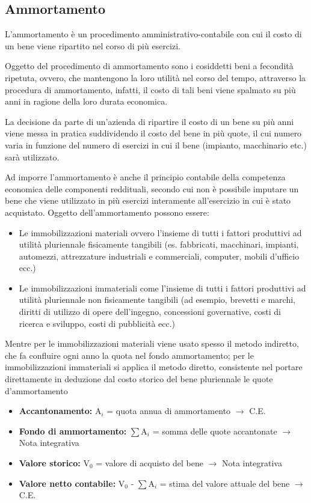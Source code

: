\subsection{Ammortamento}
L'ammortamento è un procedimento amministrativo-contabile con cui il costo di un bene viene ripartito nel corso di più esercizi.

Oggetto del procedimento di ammortamento sono i cosiddetti beni a fecondità ripetuta, ovvero, che mantengono la loro utilità nel corso del tempo, attraverso la procedura di ammortamento, infatti, il costo di tali beni viene spalmato su più anni in ragione della loro durata economica.

La decisione da parte di un’azienda di ripartire il costo di un bene su più anni viene messa in pratica suddividendo il costo del bene in più quote, il cui numero varia in funzione del numero di esercizi in cui il bene (impianto, macchinario etc.) sarà utilizzato.

Ad imporre l’ammortamento è anche il principio contabile della competenza economica delle componenti reddituali, secondo cui non è possibile imputare un bene che viene utilizzato in più esercizi interamente all'esercizio in cui è stato acquistato.
Oggetto dell'ammortamento possono essere:
\begin{itemize}
	\item Le immobilizzazioni materiali ovvero l’insieme di tutti i fattori produttivi ad utilità pluriennale fisicamente tangibili (es. fabbricati, macchinari, impianti, automezzi, attrezzature industriali e commerciali, computer, mobili d'ufficio ecc.)
	\item Le immobilizzazioni immateriali come l’insieme di tutti i fattori produttivi ad utilità pluriennale non fisicamente tangibili (ad esempio, brevetti e marchi, diritti di utilizzo di opere dell'ingegno, concessioni governative, costi di ricerca e sviluppo, costi di pubblicità ecc.)
\end{itemize}
Mentre per le immobilizzazioni materiali viene usato spesso il metodo indiretto, che fa confluire ogni anno la quota nel fondo ammortamento; per le immobilizzazioni immateriali si applica il metodo diretto, consistente nel portare direttamente in deduzione dal costo storico del bene pluriennale le quote d'ammortamento

\begin{itemize}
	\item \textbf{Accantonamento:} A$_i$ = quota annua di ammortamento $\rightarrow$ C.E.
	\item \textbf{Fondo di ammortamento:} $\sum$A$_i$ = somma delle quote accantonate $\rightarrow$ Nota integrativa
	\item \textbf{Valore storico:} V$_0$ = valore di acquisto del bene $\rightarrow$ Nota integrativa
	\item \textbf{Valore netto contabile:} V$_0$ - $\sum$A$_i$ = stima del valore attuale del bene $\rightarrow$ C.E.
\end{itemize}